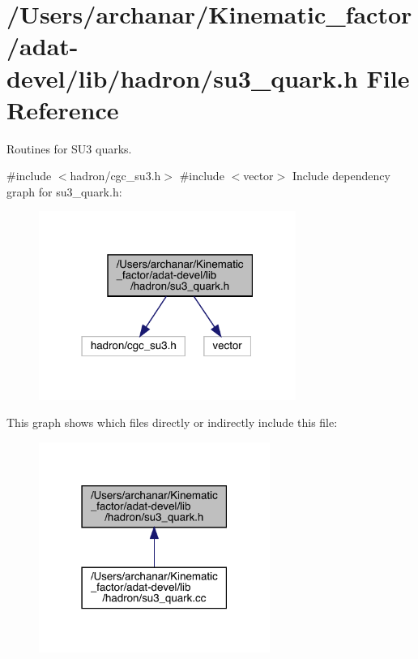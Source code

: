 \hypertarget{adat-devel_2lib_2hadron_2su3__quark_8h}{}\section{/\+Users/archanar/\+Kinematic\+\_\+factor/adat-\/devel/lib/hadron/su3\+\_\+quark.h File Reference}
\label{adat-devel_2lib_2hadron_2su3__quark_8h}


Routines for S\+U3 quarks.  


{\ttfamily \#include $<$hadron/cgc\+\_\+su3.\+h$>$}\newline
{\ttfamily \#include $<$vector$>$}\newline
Include dependency graph for su3\+\_\+quark.\+h\+:
\nopagebreak
\begin{figure}[H]
\begin{center}
\leavevmode
\includegraphics[width=238pt]{d7/de2/adat-devel_2lib_2hadron_2su3__quark_8h__incl}
\end{center}
\end{figure}
This graph shows which files directly or indirectly include this file\+:
\nopagebreak
\begin{figure}[H]
\begin{center}
\leavevmode
\includegraphics[width=214pt]{d9/d94/adat-devel_2lib_2hadron_2su3__quark_8h__dep__incl}
\end{center}
\end{figure}
